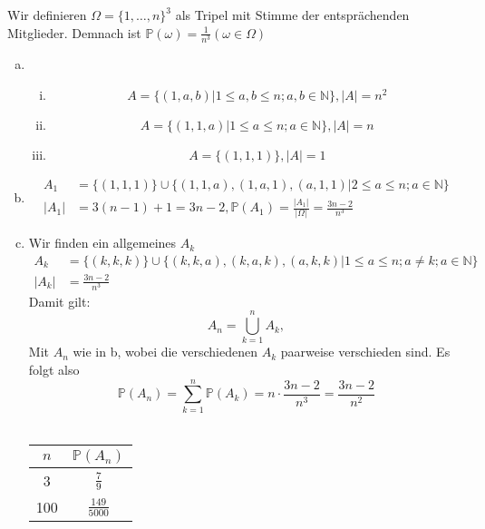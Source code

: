 \documentclass{article}
\newcommand{\N}{\mathbb{N}}
\renewcommand{\P}{\mathbb{P}}
\begin{document}
    \subsection{}
    Wir definieren $\Omega=\{1,\hdots,n\}^3$ als Tripel mit
    Stimme der entsprächenden Mitglieder.
    Demnach ist $\P(\omega)=\frac{1}{n^3} (\omega\in\Omega)$
    \begin{enumerate}[a)]
        \item
            \begin{enumerate}[(i)]
                \item
                    \begin{equation*}
                        A=\{(1,a,b)|1\leq a,b\leq n; a,b\in\N\},
                        |A|=n^2
                    \end{equation*}
                \item
                    \begin{equation*}
                        A=\{(1,1,a)|1\leq a\leq n; a\in\N\},
                        |A|=n
                    \end{equation*}
                \item
                    \begin{equation*}
                        A=\{(1,1,1)\},
                        |A|=1
                    \end{equation*}
            \end{enumerate}
        \item
            \begin{align*}
                A_1&=\{(1,1,1)\}\cup\{(1,1,a),(1,a,1),(a,1,1)
                |2\leq a\leq n;a\in\N\}\\
                |A_1|&=3(n-1)+1=3n-2,\P(A_1)=\frac{|A_1|}{|\Omega|}
                =\frac{3n-2}{n^3}
            \end{align*}
        \item
            Wir finden ein allgemeines $A_k$
            \begin{align*}
                A_k&=\{(k,k,k)\}\cup\{(k,k,a),(k,a,k),(a,k,k)
                |1\leq a\leq n; a\neq k;a\in\N\}\\
                |A_k|&=\frac{3n-2}{n^3}
            \end{align*}
            Damit gilt:
            \begin{equation*}
                A_n=\bigcup_{k=1}^{n}A_k,
            \end{equation*}
            Mit $A_n$ wie in b,
            wobei die verschiedenen $A_k$ paarweise
            verschieden sind. Es folgt also
            \begin{equation*}
                \P(A_n)=\sum_{k=1}^{n}\P(A_k)
                =n\cdot\frac{3n-2}{n^3}=\frac{3n-2}{n^2}
            \end{equation*}\\
            \begin{tabular}{c|c}
                $n$&$\P(A_n)$\\
                \hline
                3&$\frac{7}{9}$\\
                100&$\frac{149}{5000}$
            \end{tabular}
    \end{enumerate}
\end{document}
